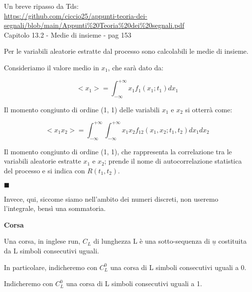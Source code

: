 \begin{tcolorbox}
    Un breve ripasso da Tds: \\
    \url{https://github.com/ciccio25/appunti-teoria-dei-segnali/blob/main/Appunti%20Teoria%20dei%20segnali.pdf} \\
    Capitolo 13.2 - Medie di insieme - pag 153 \newline 

    Per le variabili aleatorie estratte dal processo sono calcolabili le medie di insieme. \newline 

Consideriamo il valore medio in $x_1$, che sarà dato da: 

{
    \Large 
    \begin{equation}
        <x_1> 
        = 
        \int_{- \infty}^{+\infty}
        x_1 f_1 (x_1; t_1) dx_1
    \end{equation}
}

Il momento congiunto di ordine (1, 1) delle variabili $x_1$ e $x_2$ si otterrà come: 

{
    \Large 
    \begin{equation}
        <x_1 x_2> 
        = 
        \int_{- \infty}^{+\infty}
        \int_{- \infty}^{+\infty}
        x_1 x_2 f_{12} (x_1, x_2; t_1, t_2) 
        dx_1
        dx_2
    \end{equation}
}

Il momento congiunto di ordine (1, 1), che rappresenta la correlazione tra le variabili aleatorie estratte $x_1$ e $x_2$; 
prende il nome di autocorrelazione statistica del processo e si indica con $R(t_1, t_2)$. \newline 

$\blacksquare$ \newline 

Invece, qui, siccome siamo nell'ambito dei numeri discreti, non useremo l'integrale, bensì una sommatoria. 
\end{tcolorbox}

\textbf{Corsa}

Una corsa, in inglese run, $C_L$ di lunghezza L è una sotto-sequenza di $\underline{u}$ costituita da L simboli consecutivi uguali. \newline 

In particolare, indicheremo con $C_L^{0}$ una corsa di L simboli consecutivi uguali a 0. \newline 

Indicheremo con $C_L^{0}$ una corsa di L simboli consecutivi uguali a 1. \newline 

